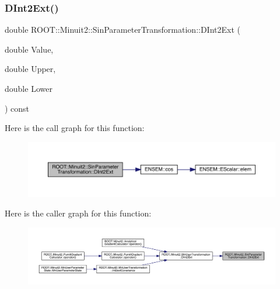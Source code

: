 \subsubsection{\texorpdfstring{DInt2Ext()}{DInt2Ext()}\hspace{0.1cm}{\footnotesize\ttfamily [1/2]}}
{\footnotesize\ttfamily double R\+O\+O\+T\+::\+Minuit2\+::\+Sin\+Parameter\+Transformation\+::\+D\+Int2\+Ext (\begin{DoxyParamCaption}\item[{double}]{Value,  }\item[{double}]{Upper,  }\item[{double}]{Lower }\end{DoxyParamCaption}) const}

Here is the call graph for this function\+:\nopagebreak
\begin{figure}[H]
\begin{center}
\leavevmode
\includegraphics[width=350pt]{de/d62/classROOT_1_1Minuit2_1_1SinParameterTransformation_a4335749e9dd572c2234a8a119893e3fd_cgraph}
\end{center}
\end{figure}
Here is the caller graph for this function\+:\nopagebreak
\begin{figure}[H]
\begin{center}
\leavevmode
\includegraphics[width=350pt]{de/d62/classROOT_1_1Minuit2_1_1SinParameterTransformation_a4335749e9dd572c2234a8a119893e3fd_icgraph}
\end{center}
\end{figure}
\mbox{\label{classROOT_1_1Minuit2_1_1SinParameterTransformation_a4335749e9dd572c2234a8a119893e3fd}} 
